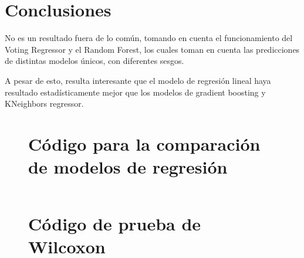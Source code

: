 \documentclass[sigconf,authorversion,nonacm]{acmart}
\begin{document}
\section{Conclusiones}
No es un resultado fuera de lo común, tomando en cuenta el funcionamiento del Voting Regressor y el Random Forest, los cuales toman en cuenta las predicciones de distintas modelos únicos, con diferentes sesgos.

A pesar de esto, resulta interesante que el modelo de regresión lineal haya resultado estadísticamente mejor que los modelos de gradient boosting y KNeighbors regressor.





\clearpage

\appendix

\begin{figure}
  \section{Código para la comparación de modelos de regresión}
  \label{appendix:regs}
  \inputminted[lastline=60]{python}{/home/mario/git/MarioJim/AirbnbPricePrediction/generate_mses_updated.py}
\end{figure}

\begin{figure}
  \section{Código de prueba de Wilcoxon}
  \label{appendix:wilc}
  \inputminted{python}{/home/mario/git/MarioJim/AirbnbPricePrediction/wilcoxon_test.py}
\end{figure}
\end{document}
